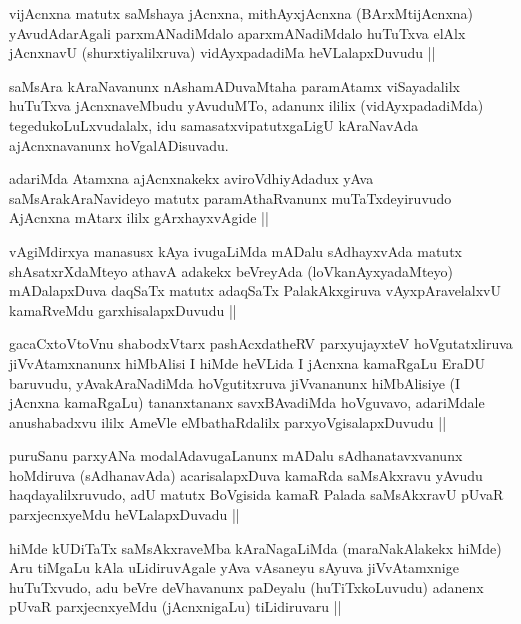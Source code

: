 \begin{artha}
vijAcnxna matutx saMshaya jAcnxna, mithAyxjAcnxna (BArxMtijAcnxna)
yAvudAdarAgali parxmANadiMdalo aparxmANadiMdalo huTuTxva elAlx
jAcnxnavU (shurxtiyalilxruva) vidAyxpadadiMa heVLalapxDuvudu ||
\end{artha}

\begin{artha}
saMsAra kAraNavanunx nAshamADuvaMtaha paramAtamx viSayadalilx huTuTxva
jAcnxnaveMbudu yAvuduMTo, adanunx ililix (vidAyxpadadiMda)
tegedukoLuLxvudalalx, idu samasatxvipatutxgaLigU kAraNavAda
ajAcnxnavanunx hoVgalADisuvadu.
\end{artha}

\begin{artha}
adariMda Atamxna ajAcnxnakekx aviroVdhiyAdadux yAva
saMsArakAraNavideyo matutx paramAthaRvanunx muTaTxdeyiruvudo AjAcnxna
mAtarx ililx gArxhayxvAgide ||
\end{artha}

\begin{artha}
vAgiMdirxya manasusx kAya ivugaLiMda mADalu sAdhayxvAda matutx
shAsatxrXdaMteyo athavA adakekx beVreyAda (loVkanAyxyadaMteyo)
mADalapxDuva daqSaTx matutx adaqSaTx PalakAkxgiruva vAyxpAravelalxvU
kamaRveMdu garxhisalapxDuvudu ||
\end{artha}

\begin{artha}
gacaCxtoV\s toV\s nu shabodxV\s tarx pashAcxdatheRV parxyujayxteV
hoVgutatxliruva jiVvAtamxnanunx hiMbAlisi I hiMde heVLida I jAcnxna
kamaRgaLu EraDU baruvudu, yAvakAraNadiMda hoVgutitxruva jiVvananunx
hiMbAlisiye (I jAcnxna kamaRgaLu) tananxtananx savxBAvadiMda
hoVguvavo, adariMdale anushabadxvu ililx AmeVle eMbathaRdalilx
parxyoVgisalapxDuvudu ||
\end{artha}


\begin{artha}
puruSanu parxyANa modalAdavugaLanunx mADalu sAdhanatavxvanunx
hoMdiruva (sAdhanavAda) acarisalapxDuva kamaRda saMsAkxravu yAvudu
haqdayalilxruvudo, adU matutx BoVgisida kamaR Palada saMsAkxravU pUvaR
parxjecnxyeMdu heVLalapxDuvadu ||
\end{artha}

\begin{artha}
hiMde kUDiTaTx saMsAkxraveMba kAraNagaLiMda (maraNakAlakekx hiMde) Aru
tiMgaLu kAla uLidiruvAgale yAva vAsaneyu sAyuva jiVvAtamxnige
huTuTxvudo, adu beVre deVhavanunx paDeyalu (huTiTxkoLuvudu) adanenx
pUvaR parxjecnxyeMdu (jAcnxnigaLu) tiLidiruvaru ||
\end{artha}

